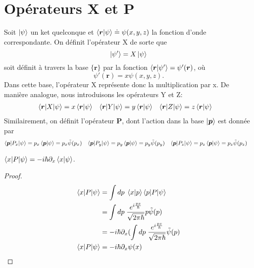 \documentclass[../Notesdecours.tex]{subfiles}
\begin{document}
\section{Opérateurs X et P}
Soit $\ket{\psi}$ un ket quelconque et $\braket{\bm{r}|\psi} \doteq \psi (x,y,z)$ la fonction d'onde correspondante. On définit l'opérateur X de sorte que
\begin{equation}
\ket{\psi'} = X\ket{\psi}
\end{equation}
soit définit à travers la base $\{\bm{r}\}$ par la fonction $\braket{\bm{r}|\psi'} = \psi'(\bm{r})$, où
\begin{equation}
\psi' (\bm{r}) = x\psi(x,y,z).
\end{equation}
Dans cette base, l'opérateur X représente donc la multiplication par x. De manière analogue, nous introduisons les opérateurs Y et Z:
\begin{align}
\braket{\bm{r}|X|\psi} &= x\braket{\bm{r}|\psi} & \braket{\bm{r}|Y|\psi} &= y\braket{\bm{r}|\psi} & \braket{\bm{r}|Z|\psi} &= z\braket{\bm{r}|\psi}
\end{align}
Similairement, on définit l'opérateur $\bm{P}$, dont l'action dans la base $\ket{\bm{p}}$ est donnée par
\begin{align}
\braket{\bm{p}|P_x|\psi} &= p_x \braket{\bm{p}|\psi} = p_x\tilde{\psi}(p_x) & \braket{\bm{p}|P_y|\psi} &= p_y \braket{\bm{p}|\psi} = p_y\tilde{\psi} (p_y) & \braket{\bm{p}|P_z|\psi} &= p_z \braket{\bm{p}|\psi} = p_z\tilde{\psi}(p_z)
\end{align}
\begin{Property} $\braket{x|P|\psi} = -i\hbar\partial_x\braket{x|\psi}$. \end{Property}
\begin{proof}
\begin{align}
\braket{x|P|\psi} &= \int dp \; \braket{x|p}\braket{p|P|\psi}\notag\\
&= \int dp \; \frac{e^{i \frac{px}{\hbar}}}{\sqrt{2\pi\hbar}}p\tilde{\psi} (p)\notag\\
&= -i\hbar \partial_x (\int dp \; \frac{e^{i \frac{px}{\hbar}}}{\sqrt{2\pi\hbar}} \tilde{\psi} (p)\notag\\
\braket{x|P|\psi} &=-i\hbar\partial_x\psi(x)
\end{align}
\end{proof}
\end{document}
